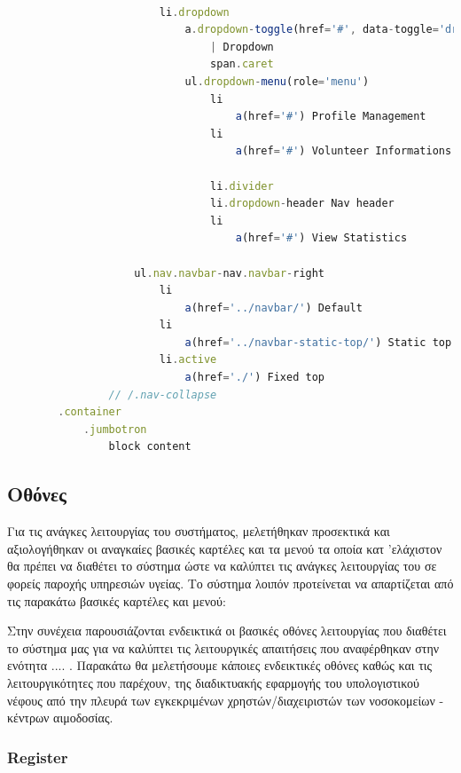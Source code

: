 \begin{lstlisting}[language=Javascript]
						                                                 
                        li.dropdown
                            a.dropdown-toggle(href='#', data-toggle='dropdown')
                                | Dropdown
                                span.caret
                            ul.dropdown-menu(role='menu')
                                li
                                    a(href='#') Profile Management
                                li
                                    a(href='#') Volunteer Informations

                                li.divider
                                li.dropdown-header Nav header
                                li
                                    a(href='#') View Statistics

                    ul.nav.navbar-nav.navbar-right
                        li
                            a(href='../navbar/') Default
                        li
                            a(href='../navbar-static-top/') Static top
                        li.active
                            a(href='./') Fixed top
                // /.nav-collapse
        .container
            .jumbotron
                block content

		\end{lstlisting}

		
	\subsection{Οθόνες}
	
		Για τις ανάγκες λειτουργίας του συστήματος, μελετήθηκαν προσεκτικά και αξιολογήθηκαν οι αναγκαίες βασικές καρτέλες και τα μενού τα οποία κατ 'ελάχιστον θα πρέπει να διαθέτει το σύστημα ώστε να καλύπτει τις ανάγκες λειτουργίας του σε φορείς παροχής υπηρεσιών υγείας. Το σύστημα λοιπόν προτείνεται να απαρτίζεται από τις παρακάτω βασικές καρτέλες και μενού:

		Στην συνέχεια παρουσιάζονται ενδεικτικά οι βασικές οθόνες λειτουργίας που διαθέτει το σύστημα μας για να καλύπτει τις λειτουργικές απαιτήσεις που αναφέρθηκαν στην ενότητα .... . Παρακάτω θα μελετήσουμε κάποιες ενδεικτικές οθόνες καθώς και τις λειτουργικότητες που παρέχουν, της διαδικτυακής εφαρμογής του υπολογιστικού νέφους από την πλευρά των εγκεκριμένων χρηστών/διαχειριστών των νοσοκομείων - κέντρων αιμοδοσίας. 
	
		\subsubsection{Register}
		
